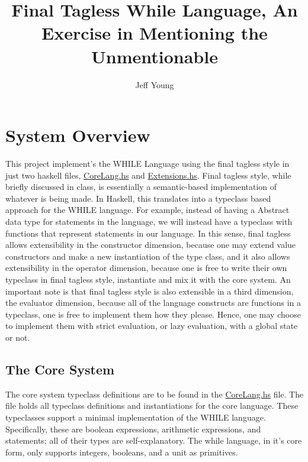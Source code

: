 \documentclass[9pt,letterpaper]{extarticle}
\title{Final Tagless While Language, An Exercise in Mentioning the Unmentionable}
\author{Jeff Young}
\date{}
\begin{document}
	\maketitle
  \section{System Overview}
  This project implement's the WHILE Language using the final tagless style in
  just two haskell files, \underline{CoreLang.hs} and \underline{Extensions.hs}.
  Final tagless style, while briefly discussed in class, is essentially a
  semantic-based implementation of whatever is being made. In Haskell, this
  translates into a typeclass based approach for the WHILE language. For
  example, instead of having a Abstract data type for statements in the
  language, we will instead have a typeclass with functions that represent
  statements in our language. In this sense, final tagless allows extensibility
  in the constructor dimension, because one may extend value constructors and
  make a new instantiation of the type class, and it also allows extensibility
  in the operator dimension, because one is free to write their own typeclass in
  final tagless style, instantiate and mix it with the core system. An important
  note is that final tagless style is also extensible in a third dimension, the
  evaluator dimension, because all of the language constructs are functions in a
  typeclass, one is free to implement them how they please. Hence, one may
  choose to implement them with strict evaluation, or lazy evaluation, with a
  global state or not.

  \subsection{The Core System}
  The core system typeclass definitions are to be found in the
  \underline{CoreLang.hs} file. The file holds all typeclass definitions and
  instantiations for the core language. These typeclasses support a minimal
  implementation of the WHILE language. Specifically, these are boolean
  expressions, arithmetic expressions, and statements; all of their types are
  self-explanatory. The while language, in it's core form, only supports
  integers, booleans, and a unit as primitives.
\end{document}
